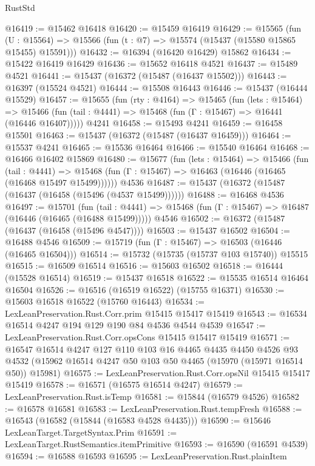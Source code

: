 \begin{lexlean}{RustStd}
\begin{coremodule}
@16419 := @15462 @16418
@16420 := @15459 @16419
@16429 := @15565
    (fun (U : @15564) => @15566 (fun (t : @7) => @15574 (@15437 (@15580 @15865 @15455) @15591)))
@16432 := @16394 (@16420 @16429) @15862
@16434 := @15422 @16419 @16429
@16436 := @15652 @16418 @4521
@16437 := @15489 @4521
@16441 := @15437 (@16372 (@15487 (@16437 @15502)))
@16443 := @16397 (@15524 @4521)
@16444 := @15508 @16443
@16446 := @15437 (@16444 @15529)
@16457 := @15655
    (fun (rty : @4164) =>
    @15465
      (fun (lets : @15464) =>
      @15466 (fun (tail : @4441) => @15468 (fun (Γ : @15467) => @16441 (@16446 @16407)))))
    @4241
@16458 := @15493 @4241
@16459 := @16458 @15501
@16463 := @15437 (@16372 (@15487 (@16437 @16459)))
@16464 := @15537 @4241
@16465 := @15536 @16464
@16466 := @15540 @16464
@16468 := @16466 @16402 @15869
@16480 := @15677
    (fun (lets : @15464) =>
    @15466
      (fun (tail : @4441) =>
      @15468 (fun (Γ : @15467) => @16463 (@16446 (@16465 (@16468 @15497 @15499))))))
    @4536
@16487 := @15437 (@16372 (@15487 (@16437 (@16458 (@15496 (@4537 @15499))))))
@16488 := @16468 @4536
@16497 := @15701
    (fun (tail : @4441) => @15468 (fun (Γ : @15467) => @16487 (@16446 (@16465 (@16488 @15499)))))
    @4546
@16502 := @16372 (@15487 (@16437 (@16458 (@15496 @4547))))
@16503 := @15437 @16502
@16504 := @16488 @4546
@16509 := @15719 (fun (Γ : @15467) => @16503 (@16446 (@16465 @16504)))
@16514 := @15732 (@15735 (@15737 @103 @15740)) @15515
@16515 := @16509 @16514
@16516 := @15603 @16502
@16518 := @16444 (@15528 @16514)
@16519 := @15437 @16518
@16522 := @15535 @16514 @16464 @16504
@16526 := @16516 (@16519 @16522) (@15755 @16371)
@16530 := @15603 @16518 @16522 (@15760 @16443)
@16534 := LexLeanPreservation.Rust.Corr.prim @15415 @15417 @15419
@16543 := @16534 @16514 @4247 @194 @129 @190 @84 @4536 @4544 @4539
@16547 := LexLeanPreservation.Rust.Corr.opsCons @15415 @15417 @15419
@16571 := @16547
    @16514
    @4247
    @127
    @110
    @103
    @16
    @4465
    @4435
    @4450
    @4526
    @93
    @4532
    (@15962 @16514 @4247 @50 @103 @50 @4465 (@15970 (@15971 @16514 @50)) @15981)
@16575 := LexLeanPreservation.Rust.Corr.opsNil @15415 @15417 @15419
@16578 := @16571 (@16575 @16514 @4247)
@16579 := LexLeanPreservation.Rust.isTemp
@16581 := @15844 (@16579 @4526)
@16582 := @16578 @16581
@16583 := LexLeanPreservation.Rust.tempFresh
@16588 := @16543 (@16582 (@15844 (@16583 @4528 @4435)))
@16590 := @15646 LexLeanTarget.TargetSyntax.Prim
@16591 := LexLeanTarget.RustSemantics.itemPrimitive
@16593 := @16590 (@16591 @4539)
@16594 := @16588 @16593
@16595 := LexLeanPreservation.Rust.plainItem

\end{coremodule}
\end{lexlean}
